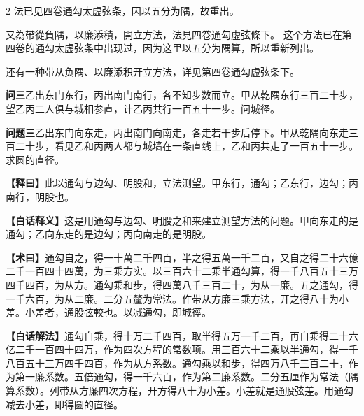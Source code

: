 \documentclass[11pt,a4paper]{article}
\newcommand{\WenQuestion}[1]{\textbf{\textcolor{classicalcolor}{#1}}}
\newcommand{\BaiQuestion}[1]{\textbf{\textcolor{moderncolor}{#1}}}
\newcommand{\WenExplain}{\textcolor{classicalcolor}{\textbf{【释曰】}}}
\newcommand{\BaiExplain}{\textcolor{moderncolor}{\textbf{【白话释义】}}}
\newcommand{\WenMethod}{\textcolor{classicalcolor}{\textbf{【术曰】}}}
\newcommand{\BaiMethod}{\textcolor{moderncolor}{\textbf{【白话解法】}}}
\begin{document}
\begin{paracol}{2}
\switchcolumn*
\small 法已见四卷通勾太虚弦条，因以五分为隅，故重出。

又為帶從負隅，以廉添積，開立方法，法見四卷通勾虛弦條下。
\switchcolumn
\small 这个方法已在第四卷的通勾太虚弦条中出现过，因为这里以五分为隅算，所以重新列出。

还有一种带从负隅、以廉添积开立方法，详见第四卷通勾虚弦条下。

\vspace{0.8em}

\switchcolumn*
\begin{tcolorbox}[colback=red!3,colframe=red!30!black,boxrule=0.3pt]
\WenQuestion{问三}\quad 乙出东门东行，丙出南门南行，各不知步数而立。甲从乾隅东行三百二十步，望乙丙二人俱与城相参直，计乙丙共行一百五十一步。问城径。
\end{tcolorbox}
\switchcolumn
\begin{tcolorbox}[colback=blue!3,colframe=blue!30!black,boxrule=0.3pt]
\BaiQuestion{问题三}\quad 乙出东门向东走，丙出南门向南走，各走若干步后停下。甲从乾隅向东走三百二十步，看见乙和丙两人都与城墙在一条直线上，乙和丙共走了一百五十一步。求圆的直径。
\end{tcolorbox}

\switchcolumn*
\begin{tcolorbox}[colback=red!5,colframe=red!30!black,boxrule=0.3pt]
\WenExplain\quad 此以通勾与边勾、明股和，立法测望。甲东行，通勾；乙东行，边勾；丙南行，明股也。
\end{tcolorbox}
\switchcolumn
\begin{tcolorbox}[colback=blue!5,colframe=blue!30!black,boxrule=0.3pt]
\BaiExplain\quad 这是用通勾与边勾、明股之和来建立测望方法的问题。甲向东走的是通勾；乙向东走的是边勾；丙向南走的是明股。
\end{tcolorbox}

\switchcolumn*
\begin{tcolorbox}[colback=red!5,colframe=red!40!black,boxrule=0.3pt]
\WenMethod\quad 通勾自之，得一十萬二千四百，半之得五萬一千二百，又自之得二十六億二千一百四十四萬，为三乘方实。以三百六十二乘半通勾算，得一千八百五十三万四千四百，为从方。通勾乘和步，得四萬八千三百二十，为从一廉。五之通勾，得一千六百，为从二廉。二分五釐为常法。作带从方廉三乘方法，开之得八十为小差。小差者，通股弦較也。以减通勾，即城徑。
\end{tcolorbox}
\switchcolumn
\begin{tcolorbox}[colback=blue!5,colframe=blue!40!black,boxrule=0.3pt]
\BaiMethod\quad 通勾自乘，得十万二千四百，取半得五万一千二百，再自乘得二十六亿二千一百四十四万，作为四次方程的常数项。用三百六十二乘以半通勾，得一千八百五十三万四千四百，作为从方系数。通勾乘以和步，得四万八千三百二十，作为第一廉系数。五倍通勾，得一千六百，作为第二廉系数。二分五厘作为常法（隅算系数）。列带从方廉四次方程，开方得八十为小差。小差就是通股弦差。用通勾减去小差，即得圆的直径。
\end{tcolorbox}

\end{paracol}
\end{document}
